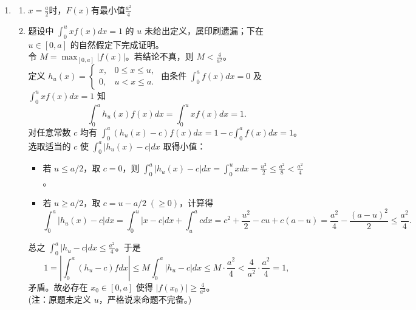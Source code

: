 \begin{enumerate}
{\begin{enumerate}
\begin{enumerate}
		\end{enumerate}
		\item 
		\begin{enumerate}
			\item
			$ x=\frac{a}{2} $时，$ F(x) $有最小值$ \frac{a^{2}}{4} $
			\item 
			题设中 $\int_{0}^{u} x f(x) d x=1$ 的 $u$ 未给出定义，属印刷遗漏；下在 $u \in[0, a]$ 的自然假定下完成证明。\\
			令 $M=\max_{[0, a]}|f(x)|$。若结论不真，则 $M<\frac{4}{a^{2}}$。\\
			定义 $h_{u}(x)=\begin{cases}x, & 0 \le x \le u,\\ 0, & u<x \le a.\end{cases}$ 由条件 $\int_{0}^{a} f(x) d x=0$ 及 $\int_{0}^{u} x f(x) d x=1$ 知
			\[
			\int_{0}^{a} h_{u}(x) f(x) d x=\int_{0}^{u} x f(x) d x=1.
			\]
			对任意常数 $c$ 均有 $\int_{0}^{a}(h_{u}(x)-c) f(x) d x=1-c \int_{0}^{a} f(x) d x=1$。选取适当的 $c$ 使 $\int_{0}^{a}|h_{u}(x)-c| d x$ 取得小值：
			\begin{itemize}
				\item 若 $u \le a / 2$，取 $c=0$，则 $\displaystyle\int_{0}^{a}|h_{u}(x)-c| d x=\int_{0}^{u} x d x=\frac{u^{2}}{2} \le \frac{a^{2}}{8}<\frac{a^{2}}{4}$。
				\item 若 $u \ge a / 2$，取 $c=u-a / 2\;( \ge 0)$，计算得
				\[
				\int_{0}^{a}|h_{u}(x)-c| d x
				=\int_{0}^{u}|x-c| d x+\int_{u}^{a} c d x
				=c^{2}+\frac{u^{2}}{2}-c u+c(a-u)
				=\frac{a^{2}}{4}-\frac{(a-u)^{2}}{2} \le \frac{a^{2}}{4}.
				\]
			\end{itemize}
			总之 $\int_{0}^{a}|h_{u}-c| d x \le \frac{a^{2}}{4}$。于是
			\[
			1=\left|\int_{0}^{a}(h_{u}-c) f d x\right|
			\le M \int_{0}^{a}|h_{u}-c| d x
			\le M \cdot \frac{a^{2}}{4}
			<\frac{4}{a^{2}} \cdot \frac{a^{2}}{4}=1,
			\]
			矛盾。故必存在 $x_{0} \in[0, a]$ 使得 $\left|f\left(x_{0}\right)\right| \geqslant \frac{4}{a^{2}}$。\\[2pt]
			{\small(注：原题未定义 $u$，严格说来命题不完备。)}
			
		\end{enumerate}
		
		
		
		
		
	\end{enumerate}
	
	
}


	
\end{enumerate}


